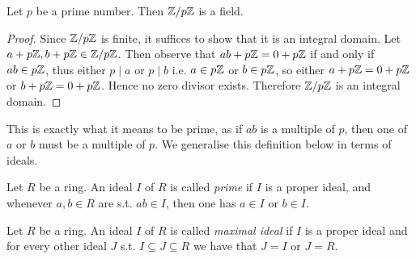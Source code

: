 \begin{corollary}
  Let $p$ be a prime number. Then $\mathbb Z/p\mathbb Z$ is a field.
  \label{<+label+>}
\end{corollary}
\begin{proof}
  Since $\mathbb Z/p\mathbb Z$ is finite, it suffices to show that it is an integral domain. Let
  $a+p\mathbb Z, b+p\mathbb Z\in \mathbb Z/p\mathbb Z$. Then observe that $ab+p\mathbb Z=0+p\mathbb Z$ if and only if $ab\in
  p\mathbb Z$, thus either $p \mid a $ or $p \mid b$ i.e. $a \in p\mathbb Z$ or $b \in p\mathbb Z$, so either $a+p\mathbb Z = 0 + p\mathbb Z$ or $b+p\mathbb Z = 0 +p\mathbb Z $.
  Hence no zero divisor exists. Therefore $\mathbb Z/p\mathbb Z$ is an integral
  domain.
\end{proof}

This is exactly what it means to be prime, as if $ab$ is a multiple of $p$, then one of $a$ or $b$ must be a multiple of $p$. We generalise this definition below in terms of ideals.

\begin{definition}
  Let $R$ be a ring. An ideal $I$ of $R$ is called \emph{prime} if $I$ is a proper ideal,
  and whenever $a,b\in R$ are s.t. $ab\in I$, then one has $a\in I$ or $b\in I$.
  \label{<+label+>}
\end{definition}

\begin{definition}
  Let $R$ be a ring. An ideal $I$ of $R$ is called \emph{maximal ideal} if $I$ is a proper
  ideal and for every other ideal $J$ s.t. $I\subseteq J \subseteq R$ we have that $J=I$
  or $J=R$.
  \label{def:maximalIdeal}
\end{definition}


